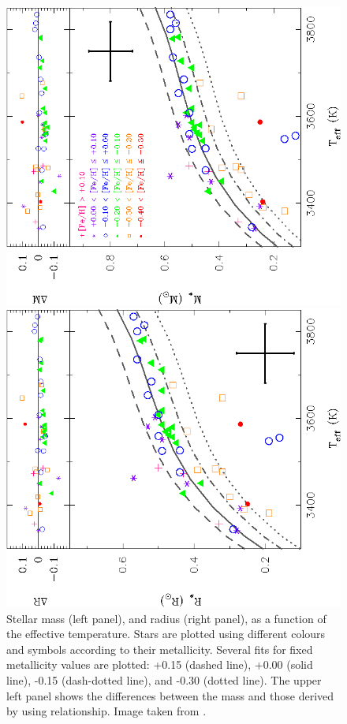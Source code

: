 \begin{figure}[!htb]
\centering
\begin{minipage}{0.47\linewidth}
\includegraphics[angle=270,scale=0.45]{3-images/stellar_mass_as_teff_metal_harps_m_gto_v26feb15.png}
\end{minipage}
\begin{minipage}{0.47\linewidth}
\includegraphics[angle=270,scale=0.45]{3-images/stellar_radii_as_teff_metal_harps_m_gto_v26feb15.png}
\end{minipage}
\caption{Stellar mass (left panel), and radius (right panel), as a function of the effective temperature. Stars are plotted using different colours and symbols according to their metallicity. Several fits for fixed metallicity values are plotted: +0.15 (dashed line), +0.00 (solid line), -0.15 (dash-dotted line), and -0.30 (dotted line). The upper left panel shows the differences between the mass and those derived by using  \protect\cite{1993AJ....106..773H} relationship. Image taken from \protect\citet{2015A&A...577A.132M}.}
\label{intro:fig:mald}
\end{figure}

